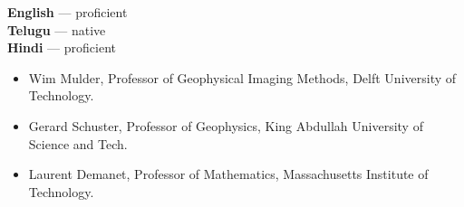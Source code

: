 \documentclass[9pt]{developercv} %
\begin{document}
\begin{minipage}[t]{0.2\textwidth}
	

	\vspace{\baselineskip} %
	
	\textbf{English} --- proficient\\
	\textbf{Telugu} --- native\\
	\textbf{Hindi} --- proficient
\end{minipage}
\hfill
\begin{minipage}[t]{0.8\textwidth}
	
	
	\begin{itemize}
			\setlength\itemsep{0.5pt}
		\item Wim Mulder,  Professor of Geophysical Imaging Methods, Delft University of Technology.
		\item Gerard Schuster,  Professor of Geophysics, King Abdullah University of Science and Tech.
		\item Laurent Demanet, Professor of Mathematics, Massachusetts Institute of Technology.
 
	\end{itemize}
\end{minipage}

\end{document}
